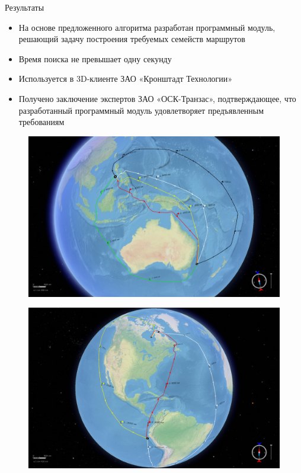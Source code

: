 \documentclass[russian, hyperref={unicode}]{beamer}
\begin{document}
\begin{frame}{Результаты}
     {
        \begin{itemize}
            \item На основе предложенного алгоритма разработан программный модуль,
              решающий задачу построения требуемых семейств маршрутов
            \item Время поиска не превышает одну секунду
            \item Используется в 3D-клиенте ЗАО «Кронштадт Технологии»
            \item Получено заключение экспертов ЗАО «ОСК-Транзас», подтверждающее,
              что разработанный программный модуль удовлетворяет предъявленным
              требованиям
        \end{itemize}
    }
     {
        \begin{figure}
            \includegraphics[width=\textwidth]{Results/1}
        \end{figure}
    }

     {
        \begin{figure}
            \includegraphics[width=\textwidth]{Results/2}
        \end{figure}
    }


\end{frame}
\end{document}
